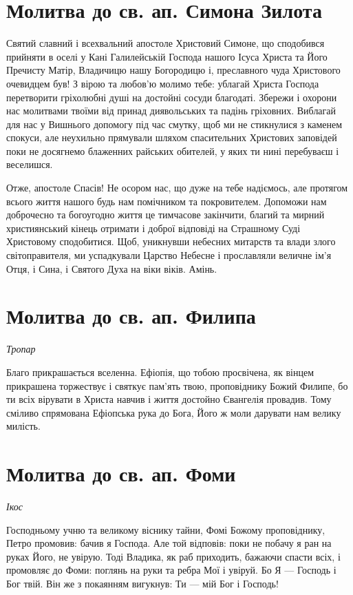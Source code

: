 \documentclass[chapters.tex]{subfiles}
\begin{document}
\section{Молитва до св. ап. Симона Зилота}
Святий славний і всехвальний апостоле Христовий Симоне, що сподобився прийняти в оселі у Кані Галилейській Господа нашого Ісуса Христа та Його Пречисту Матір, Владичицю нашу Богородицю і, преславного чуда Христового очевидцем був! З вірою та любов’ю молимо тебе: ублагай Христа Господа перетворити гріхолюбні душі на достойні сосуди благодаті. Збережи і охорони нас молитвами твоїми від принад диявольських та падінь гріховних. Виблагай для нас у Вишнього допомогу під час смутку, щоб ми не стикнулися з каменем спокуси, але неухильно прямували шляхом спасительних Христових заповідей поки не досягнемо блаженних райських обителей, у яких ти нині перебуваєш і веселишся.

Отже, апостоле Спасів! Не осором нас, що дуже на тебе надіємось, але протягом всього життя нашого будь нам помічником та покровителем. Допоможи нам доброчесно та богоугодно життя це тимчасове закінчити, благий та мирний християнський кінець отримати і доброї відповіді на Страшному Суді Христовому сподобитися. Щоб, уникнувши небесних митарств та влади злого світоправителя, ми успадкували Царство Небесне і прославляли величне ім’я Отця, і Сина, і Святого Духа на віки віків. Амінь.

\section{Молитва до св. ап. Филипа}
\emph{Тропар}

Благо прикрашається вселенна. Ефіопія, що тобою просвічена, як вінцем прикрашена торжествує і святкує пам’ять твою, проповіднику Божий Филипе, бо ти всіх вірувати в Христа навчив і життя достойно Євангелія провадив. Тому сміливо спрямована Ефіопська рука до Бога, Його ж моли дарувати нам велику милість.

\section{Молитва до св. ап. Фоми}
\emph{Ікос}

Господньому учню та великому віснику тайни, Фомі Божому проповіднику, Петро промовив: бачив я Господа. Але той відповів: поки не побачу я ран на руках Його, не увірую. Тоді Владика, як раб приходить, бажаючи спасти всіх, і промовляє до Фоми: поглянь на руки та ребра Мої і увіруй. Бо Я — Господь і Бог твій. Він же з покаянням вигукнув: Ти — мій Бог і Господь!
\end{document}
